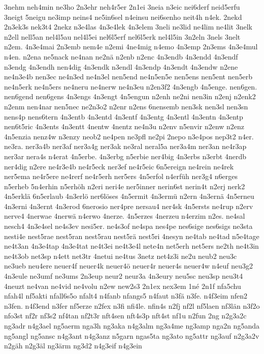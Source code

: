 {3nehm
neh4min
ne3ho
2n3ehr
neh4r5er
2n1ei
3neia
n3eic
nei6derf
neid5erfu
3neigt
5neigu
ne3imp
neins4
ne5in6sel
n4einsu
nei6senho
neit4h
n4ek.
2nekd
2n3ek3s
nek3t4
2nekz
n3e4las
4n3e4lek
4n3elem
3neli
ne3lid
ne4lim
ne4lit
3nelk
n2ell
nell5an
nel4l5au
nel4l5ei
nel6l5erf
nel6l5erk
nel4l5in
3n2eln
3nels
3nelt
n2em.
4n3e4mai
2n3emb
nem4e
n2emi
4ne4mig
n4emo
4n3emp
2n3ems
4n3e4mul
n4en.
n2ena
ne5nack
ne4nan
ne2nä
n2enb
n2enc
4n3endb
4n3endd
4n3endf
n3endg
4n3endh
nen4dig
4n3endk
n3endl
4n3endp
4n3endt
4n3endw
n2ene
ne4n3e4b
nen3ec
ne4n3ed
ne4n3el
nen5end
ne4n5en5e
nen5ens
nen5ent
nen5erb
ne4n5erk
ne4n5ers
ne4neru
ne4nerw
ne4n3eu
n2en3f2
4n3engb
4n5enge.
nen6gen.
nen6gend
nen6gens
4n3engs
4n3engt
4n5engun
n2enh
ne2ni
nen3in
n2enj
n2enk2
n2enm
nen4nar
nen5nec
ne2n3o2
n2enr
n2ens
6nensemb
nen3sk
nen3sl
nen3sn
nens4p
nens6tern
4n3entb
4n3entd
4n3entf
4n3entg
4n3entl
4n3entn
4n3entp
nen6t5ric
4n3ents
4n3entt
4nentw
4nentz
ne4n3u
n2env
n5envir
n2enw
n2enz
4n5enzia
nenz4w
n3enzy
neob2
ne4pen
ne3pfl
ne2pi
2nepo
n3e4pos
nep3t2
n4er.
ne3ra.
ner3a4b
ner3af
ner3a4g
ner3ak
ne3ral
neral5a
ner3a4m
ner3an
ne4r3ap
ner3ar
nera4s
n4erat
4n5erbe.
4n3erbg
n5erbie
ner4big
4n3erbs
n3erbt
4nerdb
ner4dig
n2ere
ne4r3e4b
ne4r5eck
ner3ef
ne4r5eic
6n5ereign
ne4rein
ne4rek
ner5ema
ne4r5ere
ne4rerf
ne4r5erh
ner5ers
4n5erfol
n4erfüh
ner3g4
n6erges
n5erheb
5n4erhin
n5erhöh
n2eri
neri4e
ner5inner
nerin6st
nerin4t
n2erj
nerk2
4n5erklä
6n5erlaub
4n3erlö
ner6löses
4n5ermit
4n3ermü
n2ern
4n3ernä
4n5erneu
4n3erni
4n3ernt
4n3erod
6nerosio
ner4pre
nersau4
ner4sk
4n5ersts
ne4rup
n2erv
nerve4
4nerwae
4nerwä
n4erwo
4nerze.
4n5erzes
4nerzeu
n4erzim
n2es.
ne4sal
nesch4
4n3e4sel
ne4s3ev
nesi5er.
ne4s3of
ne4spa
nes4pe
nes6sige
nes6sigs
ne3sta
nesti4e
nest5rae
nest5ran
nest5rau
nest5rä
nest5ri
4nesyn
ne4tab
ne4tad
n5e4tage
ne4t3an
4n3e4tap
4n3e4tat
ne4t3ei
ne4t3e4l
nete4n
net5erh
net5ers
ne2th
ne4t3in
ne4t3ob
net3sp
n4ett
net3tr
4netui
ne4tus
3netz
net4z3i
ne2u
neub2
neu3c
ne3ueb
neu4ere
neuer4f
neuer4k
neuer4ö
neuer4r
neuer4s
neuer4w
n4euf
neu3g2
4n3eule
ne3umf
ne3ums
2n3eup
neur2
neur3a
4n3eury
neu5sc
neu3sp
neu3t4
4neuzt
ne4van
ne4vid
ne4volu
n2ew
new2s3
2n1ex
nex3em
1né
2n1f
nfa5chu
nfah4l
nf5akti
nfall6s5o
nfalt4
n4fanb
nfangs5
n4faut
n3fä
n3fe.
n4f3eim
nfen2
n3fen.
n4f3end
n3fer
nf5erze
n2fex
n3fi
nfi4le.
nfin4s
n2fj
nf2l
nf5laen
nf3län
n3f2o
nfo3st
nf2r
nf3s2
nf4tan
nf2t3r
nft4sen
nft4s3p
nft4st
nf1u
n2fun
2ng
n2g3a2c
ng3adr
n4g3ael
ng5aerm
nga3h
ng3aka
n4g3alm
ng3a4me
ng3amp
nga2n
ng5anda
ng5angl
ng5ansc
n4g3ant
n4g3anz
n5garn
ngas5ta
ng3ato
ng5attr
ng3auf
n2g3a2v
n2gäh
n2g3äl
ng3ärm
ng3d2
n4g3eif
n4g3ein
}
